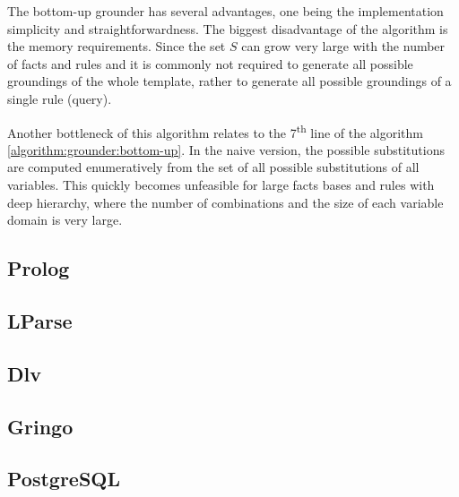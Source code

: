 \documentclass[12pt,oneside]{article}
\begin{document}
The bottom-up grounder has several advantages, one being the implementation simplicity and
straightforwardness. The biggest disadvantage of the algorithm is the memory requirements. Since
the set $S$ can grow very large with the number of facts and rules and it is commonly not required
to generate all possible groundings of the whole template, rather to generate all possible
groundings of a single rule (query).

Another bottleneck of this algorithm relates to the 7\textsuperscript{th} line of the algorithm
\ref{algorithm:grounder:bottom-up}. In the naive version, the possible substitutions are computed
enumeratively from the set of all possible substitutions of all variables. This quickly becomes
unfeasible for large facts bases and rules with deep hierarchy, where the number of combinations
and the size of each variable domain is very large.

\subsection{Prolog}

\subsection{LParse}

\subsection{Dlv}

\subsection{Gringo}

\subsection{PostgreSQL}



\end{document}
